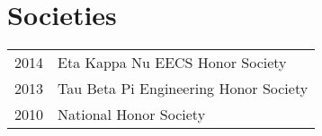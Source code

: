 \documentclass[letterpaper]{deedy-resume} %
\begin{document}
\begin{minipage}[t]{0.66\textwidth}
\sectionspace %


\section{Societies}

\begin{tabular}{rl}
2014 & Eta Kappa Nu EECS Honor Society\\
2013 & Tau Beta Pi Engineering Honor Society\\
2010 & National Honor Society \\
\end{tabular}

\sectionspace %


\end{minipage} %








\end{document}
